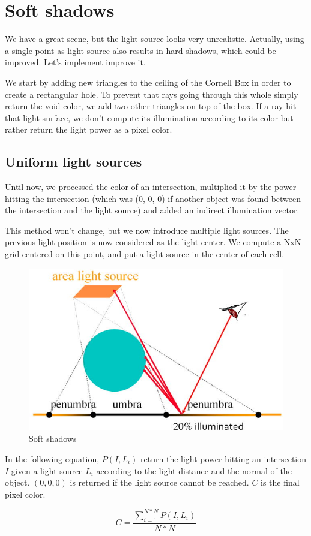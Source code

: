\section{Soft shadows}
We have a great scene, but the light source looks very unrealistic. Actually, using a single point as light source also results in hard shadows, which could be improved. Let's implement improve it.

We start by adding new triangles to the ceiling of the Cornell Box in order to create a rectangular hole. To prevent that rays going through this whole simply return the void color, we add two other triangles on top of the box. If a ray hit that light surface, we don't compute its illumination according to its color but rather return the light power as a pixel color.

\subsection{Uniform light sources}
Until now, we processed the color of an intersection, multiplied it by the power hitting the intersection (which was (0, 0, 0) if another object was found between the intersection and the light source) and added an indirect illumination vector.

This method won't change, but we now introduce multiple light sources. The previous light position is now considered as the light center. We compute a NxN grid centered on this point, and put a light source in the center of each cell.

\begin{figure}[H]
\centering
\includegraphics[width=0.35\linewidth]{img/shadows/light1.jpg}
\caption{Soft shadows}
\label{fig:light_uniform}
\end{figure}

In the following equation, $P(I, L_i)$ return the light power hitting an intersection $I$ given a light source $L_i$ according to the light distance and the normal of the object. $(0, 0, 0)$ is returned if the light source cannot be reached. $C$ is the final pixel color.

\begin{equation}
C = \frac{ \sum\limits_{i = 1}^{N*N} P(I, L_i) }{N * N}
\end{equation}

